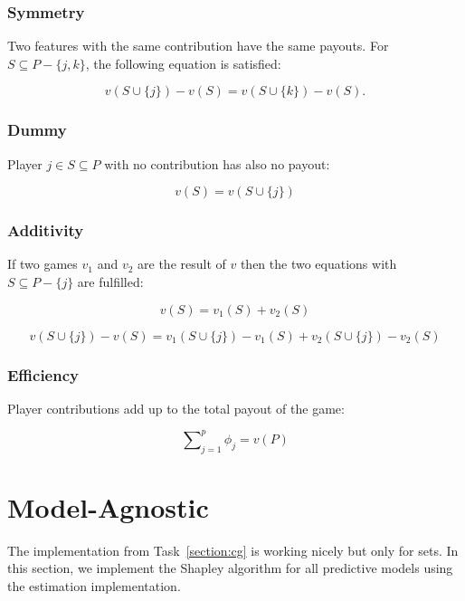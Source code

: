 \documentclass[a4paper]{article}
\begin{document}
\subsubsection{Symmetry} Two features with the same contribution have the same payouts. For $S \subseteq P - \{j,k\}$, the following equation is satisfied:

\begin{equation}
    v(S \cup \{j\}) - v(S) = v(S \cup \{k\}) -  v(S).
\end{equation}


\subsubsection{Dummy} Player $j \in S  \subseteq P$ with no contribution has also no payout:

\begin{equation}
    v(S) = v(S \cup \{j\})
\end{equation}

\subsubsection{Additivity} If two games $v_1$ and $v_2$ are the result of $v$ then the two equations with $S \subseteq P - \{j\}$ are fulfilled:

\begin{equation}
    v(S) = v_1(S) + v_2(S)
\end{equation}

\begin{equation}
v(S \cup \{j\}) - v(S) = v_1(S \cup \{j\}) - v_1(S) + v_2(S \cup \{j\}) - v_2(S)
\end{equation}


\subsubsection{Efficiency} Player contributions add up to the total payout of the game:

\begin{equation}
    \sum\nolimits_{j=1}^p\phi_j = v(P)
\end{equation}


\section{Model-Agnostic}

The implementation from Task~\ref{section:cg} is working nicely but only for sets. In this section, we implement the Shapley algorithm for all predictive models using the estimation implementation.\\
\end{document}
